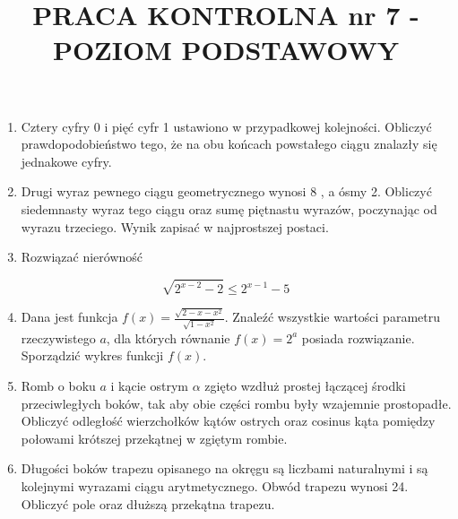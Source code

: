 \documentclass[10pt]{article}
\title{PRACA KONTROLNA nr 7 -POZIOM PODSTAWOWY }
\author{}
\date{}
\begin{document}
\maketitle
\begin{enumerate}
  \item Cztery cyfry 0 i pięć cyfr 1 ustawiono w przypadkowej kolejności. Obliczyć prawdopodobieństwo tego, że na obu końcach powstałego ciągu znalazły się jednakowe cyfry.
  \item Drugi wyraz pewnego ciągu geometrycznego wynosi 8 , a ósmy 2. Obliczyć siedemnasty wyraz tego ciągu oraz sumę piętnastu wyrazów, poczynając od wyrazu trzeciego. Wynik zapisać w najprostszej postaci.
  \item Rozwiązać nierówność
\end{enumerate}

$$
\sqrt{2^{x-2}-2} \leqslant 2^{x-1}-5
$$

\begin{enumerate}
  \setcounter{enumi}{3}
  \item Dana jest funkcja $f(x)=\frac{\sqrt{2-x-x^{2}}}{\sqrt{1-x^{2}}}$. Znaleźć wszystkie wartości parametru rzeczywistego $a$, dla których równanie $f(x)=2^{a}$ posiada rozwiązanie. Sporządzić wykres funkcji $f(x)$.
  \item Romb o boku $a$ i kącie ostrym $\alpha$ zgięto wzdłuż prostej łączącej środki przeciwległych boków, tak aby obie części rombu były wzajemnie prostopadłe. Obliczyć odległość wierzchołków kątów ostrych oraz cosinus kąta pomiędzy połowami krótszej przekątnej w zgiętym rombie.
  \item Długości boków trapezu opisanego na okręgu są liczbami naturalnymi i są kolejnymi wyrazami ciągu arytmetycznego. Obwód trapezu wynosi 24. Obliczyć pole oraz dłuższą przekątna trapezu.
\end{enumerate}
\end{document}
